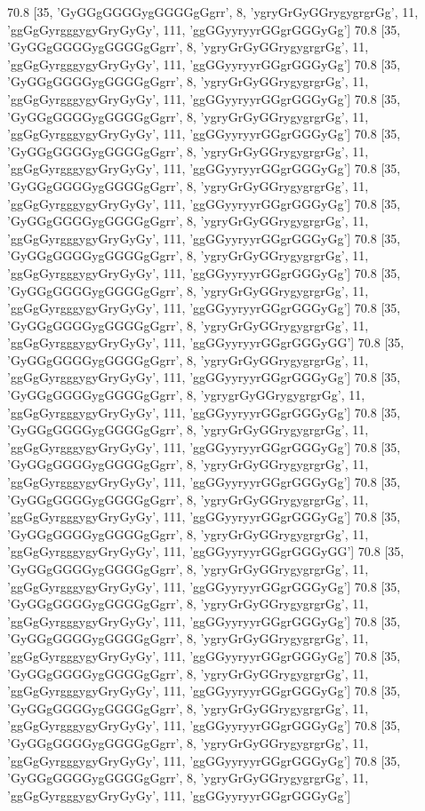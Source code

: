 70.8 [35, 'GyGGgGGGGygGGGGgGgrr', 8, 'ygryGrGyGGrygygrgrGg', 11, 'ggGgGyrgggygyGryGyGy', 111, 'ggGGyyryyrGGgrGGGyGg']
70.8 [35, 'GyGGgGGGGygGGGGgGgrr', 8, 'ygryGrGyGGrygygrgrGg', 11, 'ggGgGyrgggygyGryGyGy', 111, 'ggGGyyryyrGGgrGGGyGg']
70.8 [35, 'GyGGgGGGGygGGGGgGgrr', 8, 'ygryGrGyGGrygygrgrGg', 11, 'ggGgGyrgggygyGryGyGy', 111, 'ggGGyyryyrGGgrGGGyGg']
70.8 [35, 'GyGGgGGGGygGGGGgGgrr', 8, 'ygryGrGyGGrygygrgrGg', 11, 'ggGgGyrgggygyGryGyGy', 111, 'ggGGyyryyrGGgrGGGyGg']
70.8 [35, 'GyGGgGGGGygGGGGgGgrr', 8, 'ygryGrGyGGrygygrgrGg', 11, 'ggGgGyrgggygyGryGyGy', 111, 'ggGGyyryyrGGgrGGGyGg']
70.8 [35, 'GyGGgGGGGygGGGGgGgrr', 8, 'ygryGrGyGGrygygrgrGg', 11, 'ggGgGyrgggygyGryGyGy', 111, 'ggGGyyryyrGGgrGGGyGg']
70.8 [35, 'GyGGgGGGGygGGGGgGgrr', 8, 'ygryGrGyGGrygygrgrGg', 11, 'ggGgGyrgggygyGryGyGy', 111, 'ggGGyyryyrGGgrGGGyGg']
70.8 [35, 'GyGGgGGGGygGGGGgGgrr', 8, 'ygryGrGyGGrygygrgrGg', 11, 'ggGgGyrgggygyGryGyGy', 111, 'ggGGyyryyrGGgrGGGyGg']
70.8 [35, 'GyGGgGGGGygGGGGgGgrr', 8, 'ygryGrGyGGrygygrgrGg', 11, 'ggGgGyrgggygyGryGyGy', 111, 'ggGGyyryyrGGgrGGGyGg']
70.8 [35, 'GyGGgGGGGygGGGGgGgrr', 8, 'ygryGrGyGGrygygrgrGg', 11, 'ggGgGyrgggygyGryGyGy', 111, 'ggGGyyryyrGGgrGGGyGG']
70.8 [35, 'GyGGgGGGGygGGGGgGgrr', 8, 'ygryGrGyGGrygygrgrGg', 11, 'ggGgGyrgggygyGryGyGy', 111, 'ggGGyyryyrGGgrGGGyGg']
70.8 [35, 'GyGGgGGGGygGGGGgGgrr', 8, 'ygrygrGyGGrygygrgrGg', 11, 'ggGgGyrgggygyGryGyGy', 111, 'ggGGyyryyrGGgrGGGyGg']
70.8 [35, 'GyGGgGGGGygGGGGgGgrr', 8, 'ygryGrGyGGrygygrgrGg', 11, 'ggGgGyrgggygyGryGyGy', 111, 'ggGGyyryyrGGgrGGGyGg']
70.8 [35, 'GyGGgGGGGygGGGGgGgrr', 8, 'ygryGrGyGGrygygrgrGg', 11, 'ggGgGyrgggygyGryGyGy', 111, 'ggGGyyryyrGGgrGGGyGg']
70.8 [35, 'GyGGgGGGGygGGGGgGgrr', 8, 'ygryGrGyGGrygygrgrGg', 11, 'ggGgGyrgggygyGryGyGy', 111, 'ggGGyyryyrGGgrGGGyGg']
70.8 [35, 'GyGGgGGGGygGGGGgGgrr', 8, 'ygryGrGyGGrygygrgrGg', 11, 'ggGgGyrgggygyGryGyGy', 111, 'ggGGyyryyrGGgrGGGyGG']
70.8 [35, 'GyGGgGGGGygGGGGgGgrr', 8, 'ygryGrGyGGrygygrgrGg', 11, 'ggGgGyrgggygyGryGyGy', 111, 'ggGGyyryyrGGgrGGGyGg']
70.8 [35, 'GyGGgGGGGygGGGGgGgrr', 8, 'ygryGrGyGGrygygrgrGg', 11, 'ggGgGyrgggygyGryGyGy', 111, 'ggGGyyryyrGGgrGGGyGg']
70.8 [35, 'GyGGgGGGGygGGGGgGgrr', 8, 'ygryGrGyGGrygygrgrGg', 11, 'ggGgGyrgggygyGryGyGy', 111, 'ggGGyyryyrGGgrGGGyGg']
70.8 [35, 'GyGGgGGGGygGGGGgGgrr', 8, 'ygryGrGyGGrygygrgrGg', 11, 'ggGgGyrgggygyGryGyGy', 111, 'ggGGyyryyrGGgrGGGyGg']
70.8 [35, 'GyGGgGGGGygGGGGgGgrr', 8, 'ygryGrGyGGrygygrgrGg', 11, 'ggGgGyrgggygyGryGyGy', 111, 'ggGGyyryyrGGgrGGGyGg']
70.8 [35, 'GyGGgGGGGygGGGGgGgrr', 8, 'ygryGrGyGGrygygrgrGg', 11, 'ggGgGyrgggygyGryGyGy', 111, 'ggGGyyryyrGGgrGGGyGg']
70.8 [35, 'GyGGgGGGGygGGGGgGgrr', 8, 'ygryGrGyGGrygygrgrGg', 11, 'ggGgGyrgggygyGryGyGy', 111, 'ggGGyyryyrGGgrGGGyGg']
